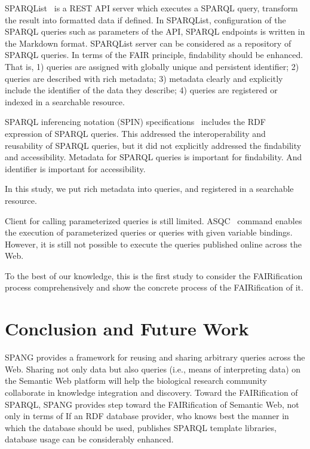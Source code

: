 \documentclass[runningheads]{llncs}
\begin{document}
SPARQList~\cite{sparqlist} is a REST API server which executes a SPARQL query, transform the result into formatted data if defined. In SPARQList, configuration of the SPARQL queries such as parameters of the API, SPARQL endpoints is written in the Markdown format. SPARQList server can be considered as a repository of SPARQL queries. In terms of the FAIR principle, findability should be enhanced. That is, 1) queries are assigned with globally unique and persistent identifier; 2) queries are described with rich metadata; 3) metadata clearly and explicitly include the identifier of the data they describe; 4) queries are registered or indexed in a searchable resource.

SPARQL inferencing notation (SPIN) specifications~\cite{spin} includes the RDF expression of SPARQL queries. This addressed the interoperability and reusability of SPARQL queries, but it did not explicitly addressed the findability and accessibility. Metadata for SPARQL queries is important for findability. And identifier is important for accessibility.

In this study, we put rich metadata into queries, and registered in a searchable resource.

Client for calling parameterized queries is still limited.
ASQC~\cite{asqc} command enables the execution of parameterized queries or queries with given variable bindings. However, it is still not possible to execute the queries published online across the Web.

To the best of our knowledge, this is the first study to consider the FAIRification process comprehensively and show the concrete process of the FAIRification of it.


\section{Conclusion and Future Work}

SPANG provides a framework for reusing and sharing arbitrary queries across the Web.
Sharing not only data but also queries (i.e., means of interpreting data) on the Semantic Web platform will help the biological research community collaborate in knowledge integration and discovery.
Toward the FAIRification of SPARQL, SPANG provides step toward the FAIRification of Semantic Web, not only in terms of 
If an RDF database provider,
who knows best the manner in which the database should be used,
publishes SPARQL template libraries, database usage can be considerably enhanced.
\end{document}
